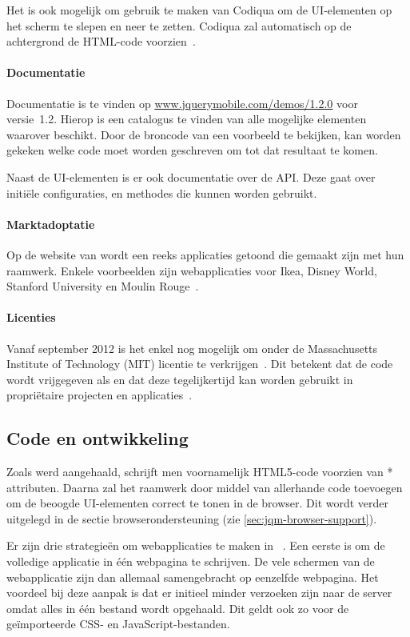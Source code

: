 Het is ook mogelijk om gebruik te maken van Codiqua om de UI-elementen op het scherm te slepen en neer te zetten. 
Codiqua zal automatisch op de achtergrond de HTML-code voorzien~\cite{Sperry2012}.

\paragraph{Documentatie}
Documentatie is te vinden op \url{www.jquerymobile.com/demos/1.2.0} voor versie~1.2. 
Hierop is een catalogus te vinden van alle mogelijke elementen waarover \jqm{} beschikt. 
Door de broncode van een voorbeeld te bekijken, kan worden gekeken welke code moet worden geschreven om tot dat resultaat te komen.

Naast de UI-elementen is er ook documentatie over de API. 
Deze gaat over initiële configuraties,  en methodes die kunnen worden gebruikt.

\paragraph{Marktadoptatie}
Op de website van \jqm{} wordt een reeks applicaties getoond die gemaakt zijn met hun raamwerk. 
Enkele voorbeelden zijn webapplicaties voor Ikea, Disney World, Stanford University en Moulin Rouge~\cite{JQuery2012a}. 

\paragraph{Licenties}
Vanaf september 2012 is het enkel nog mogelijk om \jqm{} onder de Massachusetts Institute of Technology (MIT) licentie te verkrijgen~\cite{Dmethvin2012}. 
Dit betekent dat de code wordt vrijgegeven als  en dat deze tegelijkertijd kan worden gebruikt in propriëtaire projecten en applicaties~\cite{PhilDutson2012}.

\subsection{Code en ontwikkeling}
Zoals werd aangehaald, schrijft men voornamelijk HTML5-code voorzien van * attributen. 
Daarna zal het raamwerk door middel van  allerhande code toevoegen om de beoogde UI-elementen correct te tonen in de browser. 
Dit wordt verder uitgelegd in de sectie browserondersteuning (zie \ref{sec:jqm-browser-support}).

Er zijn drie strategieën om webapplicaties te maken in \jqm{}~\cite{Broulik2012}. 
Een eerste is om de volledige applicatie in één webpagina te schrijven. 
De vele schermen van de webapplicatie zijn dan allemaal samengebracht op eenzelfde webpagina. 
Het voordeel bij deze aanpak is dat er initieel minder verzoeken zijn naar de server omdat alles in één bestand wordt opgehaald. 
Dit geldt ook zo voor de geïmporteerde CSS- en JavaScript-bestanden. 

